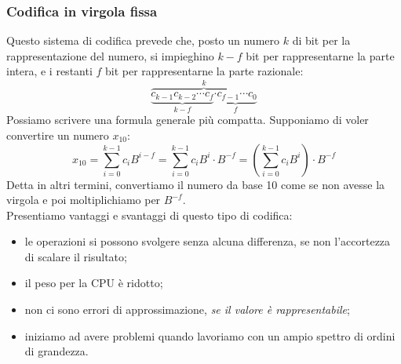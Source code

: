 \documentclass[class=book, crop=false, oneside]{standalone}
\begin{document}
\subsubsection{Codifica in virgola fissa} Questo sistema di codifica prevede che, posto un numero $k$ di bit per la rappresentazione del numero, si impieghino $k-f$ bit per rappresentarne la parte intera, e i restanti $f$ bit per rappresentarne la parte razionale:
\begin{equation*}
\overbrace{\underbrace{c_{k-1}c_{k-2}\cdots c_{f}}_\text{$k-f$}\underbrace{\cdot c_{f-1}\cdots c_{0}}_\text{$f$}}^\text{$k$}
\end{equation*}
 Possiamo scrivere una formula generale più compatta. Supponiamo di voler convertire un numero $x_{10}$:
 \begin{equation*}
 x_{10}=\sum_{i=0}^{k-1} c_{i}B^{i-f}=\sum_{i=0}^{k-1} c_{i}B^{i}\cdot B^{-f}=(\sum_{i=0}^{k-1} c_{i}B^{i})\cdot B^{-f}
 \end{equation*}
 Detta in altri termini, convertiamo il numero da base 10 come se non avesse la virgola e poi moltiplichiamo per $B^{-f}$.\\
 Presentiamo vantaggi e svantaggi di questo tipo di codifica:
  \begin{itemize}[noitemsep,nolistsep]
  	\item le operazioni si possono svolgere senza alcuna differenza, se non l'accortezza di scalare il risultato;
  	\item il peso per la CPU è ridotto;
  	\item non ci sono errori di approssimazione, \emph{se il valore è rappresentabile};
  	\item iniziamo ad avere problemi quando lavoriamo con un ampio spettro di ordini di grandezza.
  \end{itemize}
\end{document}
